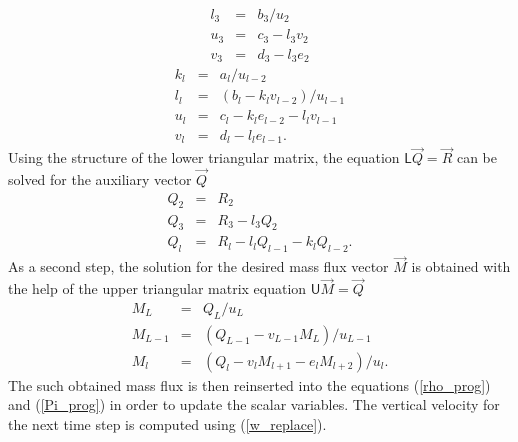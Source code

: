 \documentclass[a4paper,10pt]{article}
\begin{document}
\begin{eqnarray*}
 l_3&=&b_3/u_2\\
 u_3&=&c_3-l_3v_2\\
 v_3&=&d_3-l_3e_2
\end{eqnarray*}
\begin{eqnarray*}
 k_l&=&a_l/u_{l-2}\\
 l_l&=&(b_l-k_lv_{l-2})/u_{l-1}\\
 u_l&=&c_l-k_le_{l-2}-l_lv_{l-1}\\
 v_l&=&d_l-l_le_{l-1}.
\end{eqnarray*}
Using the structure of the lower triangular matrix, the equation $\mathsf{L}\vec{Q}=\vec{R}$ can be solved for the auxiliary vector $\vec{Q}$
\begin{eqnarray*}
 Q_2&=&R_2\\
 Q_3&=&R_3-l_3Q_2\\
 Q_l&=&R_l-l_lQ_{l-1}-k_lQ_{l-2}.
\end{eqnarray*}
As a second step, the solution for the desired mass flux vector $\vec{M}$ is obtained with the help of the upper triangular matrix equation $\mathsf{U}\vec{M}=\vec{Q}$
\begin{eqnarray*}
 M_L&=&Q_L/u_L\\
 M_{L-1}&=&(Q_{L-1}-v_{L-1}M_L)/u_{L-1}\\
 M_{l}&=&(Q_{l}-v_{l}M_{l+1}-e_{l}M_{l+2})/u_l.
\end{eqnarray*}
The such obtained mass flux is then reinserted into the equations (\ref{rho_prog}) and (\ref{Pi_prog}) in order to update the scalar variables. The vertical velocity for the next time step is computed using (\ref{w_replace}).
\end{document}
